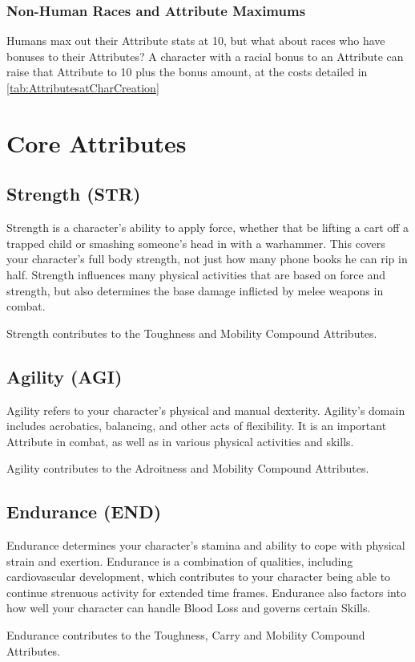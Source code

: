 \documentclass[oneside,11pt,english]{book}
\begin{document}
\subsubsection{Non-Human Races and Attribute Maximums}
Humans max out their Attribute stats at 10, but what about races who have bonuses to their Attributes? A 
character with a racial bonus to an Attribute can raise that Attribute to 10 plus the bonus amount, at the 
costs detailed in \autoref{tab:AttributesatCharCreation}
\section{Core Attributes}
\subsection*{Strength (STR)}
Strength is a character's ability to apply force, whether that be lifting a cart off a trapped child or 
smashing someone's head in with a warhammer. This covers your character’s full body strength, not just 
how many phone books he can rip in half. Strength influences many physical activities that are based on 
force and strength, but also determines the base damage inflicted by melee weapons in combat. 


Strength contributes to the Toughness and Mobility Compound Attributes.
\subsection*{Agility (AGI)} 
Agility refers to your character’s physical and manual dexterity. Agility’s domain includes acrobatics, 
balancing, and other acts of flexibility. It is an important Attribute in combat, as well as in various 
physical activities and skills. 

Agility contributes to the Adroitness and Mobility Compound Attributes. 

\subsection*{Endurance (END)}
Endurance determines your character’s stamina and ability to cope with physical strain and exertion. 
Endurance is a combination of qualities, including cardiovascular development, which contributes to your 
character being able to continue strenuous activity for extended time frames. Endurance also factors into 
how well your character can handle Blood Loss and governs certain Skills. 

Endurance contributes to the Toughness, Carry and Mobility Compound Attributes. 
\end{document}
